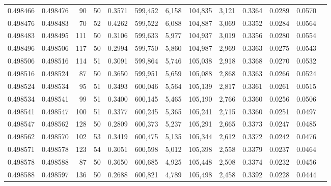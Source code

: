 \begin{tabular}{rrrrrrrrrrrrr}
0.498466 & 0.498476 &    90 &  50 &                                     0.3571 & 599,452 &   6,158 & 104,835 &   3,121 & 0.3364 & 0.0289 & 0.0570 \\
0.498476 & 0.498483 &    70 &  52 &                                     0.4262 & 599,522 &   6,088 & 104,887 &   3,069 & 0.3352 & 0.0284 & 0.0564 \\
0.498483 & 0.498495 &   111 &  50 &                                     0.3106 & 599,633 &   5,977 & 104,937 &   3,019 & 0.3356 & 0.0280 & 0.0554 \\
0.498496 & 0.498506 &   117 &  50 &                                     0.2994 & 599,750 &   5,860 & 104,987 &   2,969 & 0.3363 & 0.0275 & 0.0543 \\
0.498506 & 0.498516 &   114 &  51 &                                     0.3091 & 599,864 &   5,746 & 105,038 &   2,918 & 0.3368 & 0.0270 & 0.0532 \\
0.498516 & 0.498524 &    87 &  50 &                                     0.3650 & 599,951 &   5,659 & 105,088 &   2,868 & 0.3363 & 0.0266 & 0.0524 \\
0.498524 & 0.498534 &    95 &  51 &                                     0.3493 & 600,046 &   5,564 & 105,139 &   2,817 & 0.3361 & 0.0261 & 0.0515 \\
0.498534 & 0.498541 &    99 &  51 &                                     0.3400 & 600,145 &   5,465 & 105,190 &   2,766 & 0.3360 & 0.0256 & 0.0506 \\
0.498541 & 0.498547 &   100 &  51 &                                     0.3377 & 600,245 &   5,365 & 105,241 &   2,715 & 0.3360 & 0.0251 & 0.0497 \\
0.498547 & 0.498562 &   128 &  50 &                                     0.2809 & 600,373 &   5,237 & 105,291 &   2,665 & 0.3373 & 0.0247 & 0.0485 \\
0.498562 & 0.498570 &   102 &  53 &                                     0.3419 & 600,475 &   5,135 & 105,344 &   2,612 & 0.3372 & 0.0242 & 0.0476 \\
0.498571 & 0.498578 &   123 &  54 &                                     0.3051 & 600,598 &   5,012 & 105,398 &   2,558 & 0.3379 & 0.0237 & 0.0464 \\
0.498578 & 0.498588 &    87 &  50 &                                     0.3650 & 600,685 &   4,925 & 105,448 &   2,508 & 0.3374 & 0.0232 & 0.0456 \\
0.498588 & 0.498597 &   136 &  50 &                                     0.2688 & 600,821 &   4,789 & 105,498 &   2,458 & 0.3392 & 0.0228 & 0.0444 \\

\end{tabular}
